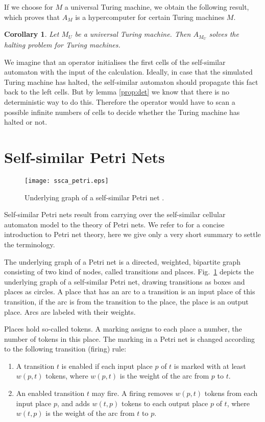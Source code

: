 \documentclass{article}
\newtheorem{cor}{Corollary}
\theoremstyle{definition}
\begin{document}
If we choose for $M$ a universal Turing machine, we obtain the following result, which proves that $A_M$ is a hypercomputer
for certain Turing machines $M$.
\begin{cor}
Let $M_U$ be a universal Turing machine. Then $A_{M_U}$ solves the halting problem for Turing machines.
\end{cor}

We imagine that an operator initialises the first cells of the self-similar automaton with the input of the calculation.
Ideally, in case that the simulated Turing machine has halted, the self-similar automaton should propagate this fact
back to the left cells.
But by lemma \ref{prop:det} we know that there is no deterministic way to do this.
Therefore the operator would have to scan a possible infinite numbers of cells to decide whether the Turing machine has
halted or not.

\section{Self-similar Petri Nets}
\label{sec:petri}

\begin{figure}
\begin{center}
\texttt{[image: ssca\_petri.eps]}
\caption{\label{fig:petri} Underlying graph of a self-similar Petri net \cite{2008-sica}.}
\end{center}
\end{figure}

Self-similar Petri nets result from carrying over the self-similar cellular automaton model to the theory of Petri nets.
We refer to \cite{Murata89} for a concise introduction to Petri net theory, here we give only a very short
summary to settle the terminology.

The underlying graph of a Petri net is a directed, weighted, bipartite graph consisting of two kind of nodes,
called transitions and places.
Fig.~\ref{fig:petri} depicts the underlying graph of a self-similar Petri net, drawing
transitions as boxes and places as circles.
A place that has an arc to a transition is an input place of this transition,
if the arc is from the transition to the place, the place is an output place.
Arcs are labeled with their weights.

Places hold so-called tokens.
A marking assigns to each place a number, the number of tokens in this place.
The marking in a Petri net is changed according to the following transition (firing) rule:
\begin{enumerate}
\item A transition $t$ is enabled if each input place $p$ of $t$ is marked with at
least $w(p,t)$ tokens, where $w(p,t)$ is the weight of the arc from $p$ to $t$.
\item An enabled transition $t$ may fire. A firing removes $w(p,t)$ tokens from each input place $p$,
and adds $w(t,p)$ tokens to each output place $p$ of $t$, where $w(t,p)$ is the weight
of the arc from $t$ to $p$.
\end{enumerate}
\end{document}
